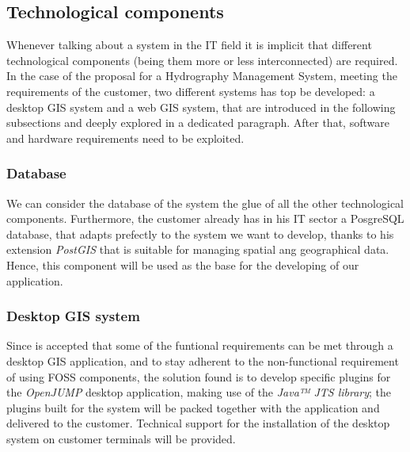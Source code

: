 \subsection{Technological components}
Whenever talking about a system in the IT field it is implicit that different technological components (being them more or less interconnected) are required. In the case of the proposal for a Hydrography Management System, meeting the requirements of the customer, two different systems has top be developed: a desktop GIS system and a web GIS system, that are introduced in the following subsections and deeply explored in a dedicated paragraph. After that, software and hardware requirements need to be exploited.

\subsubsection{Database}
We can consider the database of the system the glue of all the other technological components. Furthermore, the customer already has in his IT sector a PosgreSQL database, that adapts prefectly to the system we want to develop, thanks to his extension \textit{PostGIS} that is suitable for managing spatial ang geographical data. Hence, this component will be used as the base for the developing of our application.
\subsubsection{Desktop GIS system}
Since is accepted that some of the funtional requirements can be met through a desktop GIS application, and to stay adherent to the non-functional requirement of using FOSS components, the solution found is to develop specific plugins for the \textit{OpenJUMP} desktop application, making use of the \textit{Java™ JTS library}; the plugins built for the system will be packed together with the application and delivered to the customer. Technical support for the installation of the desktop system on customer terminals will be provided.
